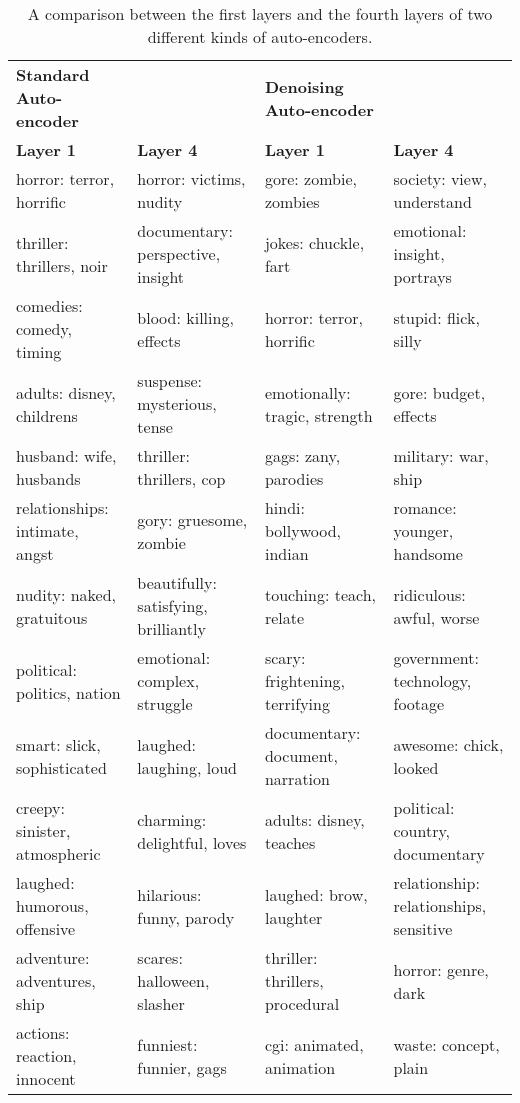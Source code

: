 \begin{sidewaystable}
	\label{ch5:labelcomparison}
	\caption{A comparison between the first layers and the fourth layers of two different kinds of auto-encoders.}
	\vspace{5 mm}
	\begin{adjustbox}{center}
		\begin{tabular}{|ll|ll|}
			\hline
			\bf Standard Auto-encoder &   & \textbf{Denoising Auto-encoder} &   \\
			\bf Layer 1  \bf   & \bf Layer 4 \bf &  \textbf{Layer 1}  \bf   & \bf Layer 4 \bf \\
			\hline
			horror: terror, horrific & horror: victims, nudity  & gore: zombie, zombies & society: view, understand \\
			thriller: thrillers, noir & documentary: perspective, insight  & jokes: chuckle, fart & emotional: insight, portrays \\
			comedies: comedy, timing & blood: killing, effects   & horror: terror, horrific & stupid: flick, silly  \\
			adults: disney, childrens & suspense: mysterious, tense & emotionally: tragic, strength &  gore: budget, effects  \\
			husband: wife, husbands &  thriller: thrillers, cop  & gags: zany, parodies & military: war, ship \\
			relationships: intimate, angst & gory: gruesome, zombie  & hindi: bollywood, indian & romance: younger, handsome \\
			nudity: naked, gratuitous & beautifully: satisfying, brilliantly & touching: teach, relate & ridiculous: awful, worse   \\
			political: politics, nation & emotional: complex, struggle & scary: frightening, terrifying & government: technology, footage  \\
			smart: slick, sophisticated &  laughed: laughing, loud & documentary: document, narration & awesome: chick, looked\\
			creepy: sinister, atmospheric & charming: delightful, loves & adults: disney, teaches &  political: country, documentary\\
			laughed: humorous, offensive & hilarious: funny, parody & laughed: brow, laughter & relationship: relationships, sensitive \\
			adventure: adventures, ship & scares: halloween, slasher & thriller: thrillers, procedural & horror: genre, dark  \\
			actions: reaction, innocent & funniest: funnier, gags & cgi: animated, animation &  waste: concept, plain   \\

\end{tabular}
\end{adjustbox}
\end{sidewaystable}
